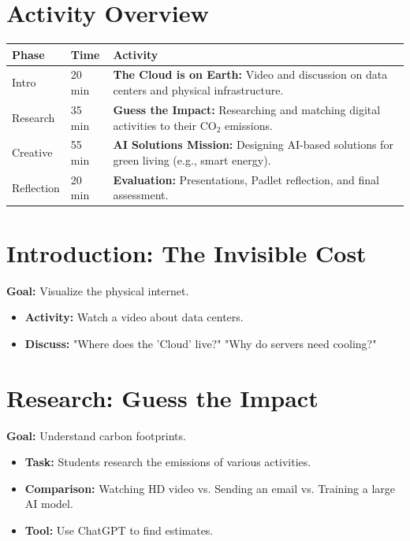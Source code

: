\documentclass[11pt, a4paper]{article}
\begin{document}
\section*{Activity Overview}
\begingroup
\small
\begin{tabularx}{\textwidth}{|l|l|L|}
    \hline
     \textbf{Phase} & \textbf{Time} & \textbf{Activity} \\ \hline
    Intro & 20 min & \textbf{The Cloud is on Earth:} Video and discussion on data centers and physical infrastructure. \\ \hline
    Research & 35 min & \textbf{Guess the Impact:} Researching and matching digital activities to their CO$_2$ emissions. \\ \hline
    Creative & 55 min & \textbf{AI Solutions Mission:} Designing AI-based solutions for green living (e.g., smart energy). \\ \hline
    Reflection & 20 min & \textbf{Evaluation:} Presentations, Padlet reflection, and final assessment. \\ \hline
\end{tabularx}
\endgroup

\section{Introduction: The Invisible Cost}
\textbf{Goal:} Visualize the physical internet.
\begin{itemize}
    \item \textbf{Activity:} Watch a video about data centers.
    \item \textbf{Discuss:} "Where does the 'Cloud' live?" "Why do servers need cooling?"
\end{itemize}

\section{Research: Guess the Impact}
\textbf{Goal:} Understand carbon footprints.
\begin{itemize}
    \item \textbf{Task:} Students research the emissions of various activities.
    \item \textbf{Comparison:} Watching HD video vs. Sending an email vs. Training a large AI model.
    \item \textbf{Tool:} Use ChatGPT to find estimates.
\end{itemize}
\end{document}
